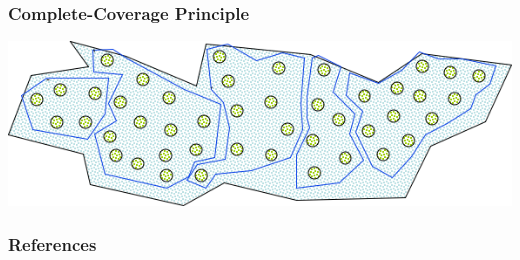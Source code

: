 \documentclass[t,12pt,numbers,fleqn]{beamer}
\begin{document}

\begin{frame}
\frametitle{Complete-Coverage Principle}

\includegraphics[scale=0.5]{../Figures/CompleteCoveragePrinciple.png}

\end{frame}


\begin{frame}[allowframebreaks]
\frametitle{References}



\end{frame}

\end{document}
